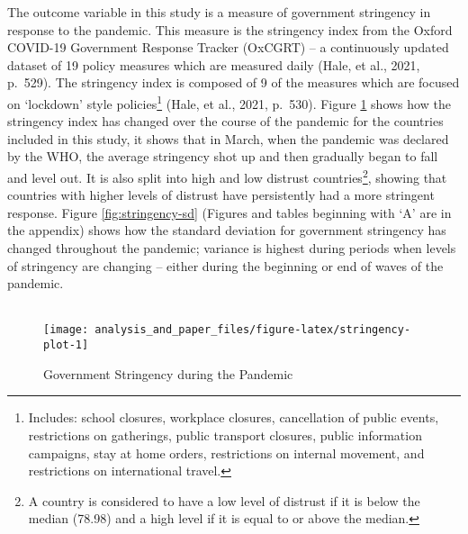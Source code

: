 \documentclass[
  12pt,
]{article}
\begin{document}
The outcome variable in this study is a measure of government stringency in response to the pandemic. This measure is the stringency index from the Oxford COVID-19 Government Response Tracker (OxCGRT) -- a continuously updated dataset of 19 policy measures which are measured daily (Hale, et al., 2021, p.~529). The stringency index is composed of 9 of the measures which are focused on `lockdown' style policies\footnote{Includes: school closures, workplace closures, cancellation of public events, restrictions on gatherings, public transport closures, public information campaigns, stay at home orders, restrictions on internal movement, and restrictions on international travel.} (Hale, et al., 2021, p.~530). Figure \ref{fig:stringency-plot} shows how the stringency index has changed over the course of the pandemic for the countries included in this study, it shows that in March, when the pandemic was declared by the WHO, the average stringency shot up and then gradually began to fall and level out. It is also split into high and low distrust countries\footnote{A country is considered to have a low level of distrust if it is below the median (78.98) and a high level if it is equal to or above the median.}, showing that countries with higher levels of distrust have persistently had a more stringent response. Figure \ref{fig:stringency-sd} (Figures and tables beginning with `A' are in the appendix) shows how the standard deviation for government stringency has changed throughout the pandemic; variance is highest during periods when levels of stringency are changing -- either during the beginning or end of waves of the pandemic.\\
~\\

\begin{figure}
\texttt{[image: analysis\_and\_paper\_files/figure-latex/stringency-plot-1]} \caption{Government Stringency during the Pandemic}\label{fig:stringency-plot}
\end{figure}
\end{document}
